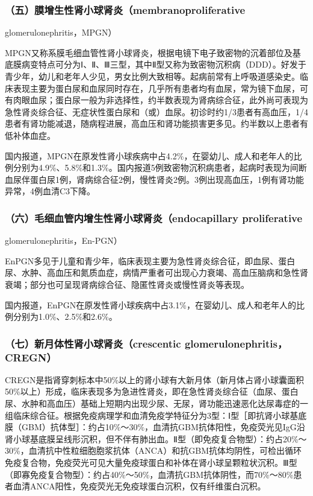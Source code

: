 \subsubsection{（五）膜增生性肾小球肾炎（membranoproliferative}
glomerulonephritis，MPGN）

MPGN又称系膜毛细血管性肾小球肾炎，根据电镜下电子致密物的沉着部位及基底膜病变特点可分为Ⅰ、Ⅱ、Ⅲ三型，其中Ⅱ型又称为致密物沉积病（DDD）。好发于青少年，幼儿和老年人少见，男女比例大致相等。起病前常有上呼吸道感染史。临床表现主要为蛋白尿和血尿同时存在，几乎所有患者均有血尿，常为镜下血尿，可有肉眼血尿；蛋白尿一般为非选择性，约半数表现为肾病综合征，此外尚可表现为急性肾炎综合征、无症状性蛋白尿和（或）血尿。初诊时约1/3患者有高血压，1/4患者有肾功能减退，随病程进展，高血压和肾功能损害更多见。约半数以上患者有低补体血症。

国内报道，MPGN在原发性肾小球疾病中占4.2\%，在婴幼儿、成人和老年人的比例分别为4.9\%、5.8\%和1.3\%。国内报道5例致密物沉积病患者，起病时表现为间断血尿伴蛋白尿1例，肾病综合征2例，慢性肾炎2例。3例出现高血压，1例有肾功能异常，4例血清C3下降。

\subsubsection{（六）毛细血管内增生性肾小球肾炎（endocapillary proliferative}
glomerulonephritis，En-PGN）

EnPGN多见于儿童和青少年，临床表现主要为急性肾炎综合征，即血尿、蛋白尿、水肿、高血压和氮质血症，病情严重者可出现心力衰竭、高血压脑病和急性肾衰竭；部分也可呈现肾病综合征、隐匿性肾炎或慢性肾炎等表现。

国内报道，EnPGN在原发性肾小球疾病中占3.1\%，在婴幼儿、成人和老年人的比例分别为1.0\%、2.5\%和2.6\%。

\subsubsection{（七）新月体性肾小球肾炎（crescentic glomerulonephritis，CREGN）}

CREGN是指肾穿刺标本中50\%以上的肾小球有大新月体（新月体占肾小球囊面积50\%以上）形成，临床表现多为急进性肾炎，即在急性肾炎综合征（血尿、蛋白尿、水肿和高血压）基础上短期内出现少尿、无尿，肾功能迅速恶化达尿毒症的一组临床综合征。根据免疫病理学和血清免疫学特征分为3型：Ⅰ型［即抗肾小球基底膜（GBM）抗体型］：约占10\%～30\%，血清抗GBM抗体阳性，免疫荧光见IgG沿肾小球基底膜呈线形沉积，但不伴有肺出血。Ⅱ型（即免疫复合物型）：约占20\%～30\%，血清抗中性粒细胞胞浆抗体（ANCA）和抗GBM抗体均阴性，可检出循环免疫复合物，免疫荧光可见大量免疫球蛋白和补体在肾小球呈颗粒状沉积。Ⅲ型（即寡免疫复合物型）：约占40\%～50\%，血清抗GBM抗体阴性，而70\%～80\%患者血清ANCA阳性，免疫荧光无免疫球蛋白沉积，仅有纤维蛋白沉积。

